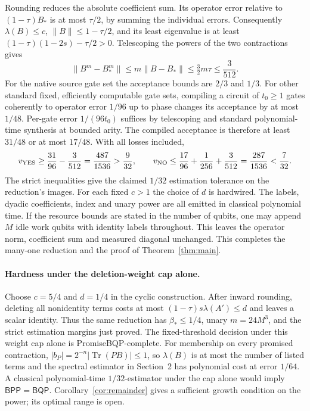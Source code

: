 \documentclass[11pt]{article}
\newcommand{\norm}[1]{\lVert #1\rVert}
\newcommand{\BPP}{\mathsf{BPP}}
\newcommand{\BQP}{\mathsf{BQP}}
\begin{document}
Rounding reduces the absolute coefficient sum. Its operator error relative to \((1-\tau)B_*\) is at most \(\tau/2\), by summing the individual errors. Consequently \(\lambda(B)\le c\), \(\norm{B}\le1-\tau/2\), and its least eigenvalue is at least \((1-\tau)(1-2s)-\tau/2>0\). Telescoping the powers of the two contractions gives
\[
 \norm{B^m-B_*^m}\le m\norm{B-B_*}\le \tfrac32m\tau\le\frac{3}{512}.
\]
For the native source gate set the acceptance bounds are \(2/3\) and \(1/3\). For other standard fixed, efficiently computable gate sets, compiling a circuit of \(t_0\ge1\) gates coherently to operator error \(1/96\) up to phase changes its acceptance by at most \(1/48\). Per-gate error \(1/(96t_0)\) suffices by telescoping and standard polynomial-time synthesis at bounded arity. The compiled acceptance is therefore at least \(31/48\) or at most \(17/48\). With all losses included,
\[
 v_{\rm YES}\ge\frac{31}{96}-\frac3{512}=\frac{487}{1536}>\frac9{32},
 \qquad
 v_{\rm NO}\le\frac{17}{96}+\frac1{256}+\frac3{512}
 =\frac{287}{1536}<\frac7{32}.
\]
The strict inequalities give the claimed \(1/32\) estimation tolerance on the reduction's images. For each fixed \(c>1\) the choice of \(d\) is hardwired. The labels, dyadic coefficients, index and unary power are all emitted in classical polynomial time. If the resource bounds are stated in the number of qubits, one may append \(M\) idle work qubits with identity labels throughout. This leaves the operator norm, coefficient sum and measured diagonal unchanged. This completes the many-one reduction and the proof of Theorem~\ref{thm:main}.

\paragraph{Hardness under the deletion-weight cap alone.}
Choose \(c=5/4\) and \(d=1/4\) in the cyclic construction. After inward rounding, deleting all nonidentity terms costs at most \((1-\tau)s\lambda(A')\le d\) and leaves a scalar identity. Thus the same reduction has \(\beta_*\le1/4\), unary \(m=24M^3\), and the strict estimation margins just proved. The fixed-threshold decision under this weight cap alone is PromiseBQP-complete. For membership on every promised contraction, \(|b_P|=2^{-n}|\operatorname{Tr}(PB)|\le1\), so \(\lambda(B)\) is at most the number of listed terms and the spectral estimator in Section~2 has polynomial cost at error \(1/64\). A classical polynomial-time \(1/32\)-estimator under the cap alone would imply \(\BPP=\BQP\). Corollary~\ref{cor:remainder} gives a sufficient growth condition on the power; its optimal range is open.
\end{document}
